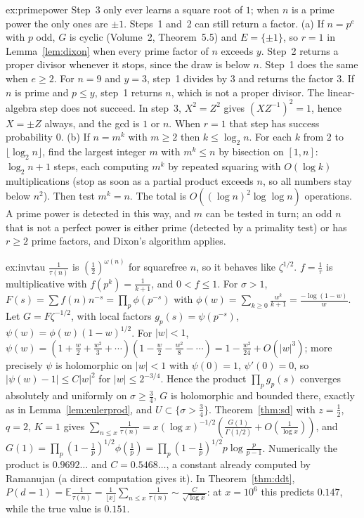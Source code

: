 \begin{solution}{ex:primepower}
\idea Step~3 only ever learns a square root of $1$; when $n$ is a prime power the only ones are $\pm1$. Steps~1 and~2 can still return a factor.
\writeup (a) If $n=p^e$ with $p$ odd, $G$ is cyclic (Volume~2, Theorem~5.5) and $E=\{\pm1\}$, so $r=1$ in Lemma~\ref{lem:dixon} when every prime factor of $n$ exceeds $y$. Step~2 returns a proper divisor whenever it stops, since the draw is below $n$. Step~1 does the same when $e\ge2$. For $n=9$ and $y=3$, step~1 divides by $3$ and returns the factor $3$. If $n$ is prime and $p\le y$, step~1 returns $n$, which is not a proper divisor. The linear-algebra step does not succeed. In step~3, $X^2=Z^2$ gives $(XZ^{-1})^2=1$, hence $X=\pm Z$ always, and the gcd is $1$ or $n$. When $r=1$ that step has success probability $0$. (b) If $n=m^k$ with $m\ge2$ then $k\le\log_2n$. For each $k$ from $2$ to $\lfloor\log_2n\rfloor$, find the largest integer $m$ with $m^k\le n$ by bisection on $[1,n]$: $\log_2n+1$ steps, each computing $m^k$ by repeated squaring with $O(\log k)$ multiplications (stop as soon as a partial product exceeds $n$, so all numbers stay below $n^2$). Then test $m^k=n$. The total is $O((\log n)^2\log\log n)$ operations. A prime power is detected in this way, and $m$ can be tested in turn; an odd $n$ that is not a perfect power is either prime (detected by a primality test) or has $r\ge2$ prime factors, and Dixon's algorithm applies.
\end{solution}

\begin{solution}{ex:invtau}
\idea $\frac1{\tau(n)}$ is $(\frac12)^{\omega(n)}$ for squarefree $n$, so it behaves like $\zeta^{1/2}$.
\writeup $f=\frac1\tau$ is multiplicative with $f(p^k)=\frac1{k+1}$, and $0<f\le1$. For $\sigma>1$, $F(s)=\sum f(n)n^{-s}=\prod_p\phi(p^{-s})$ with $\phi(w)=\sum_{k\ge0}\frac{w^k}{k+1}=\frac{-\log(1-w)}w$. Let $G=F\zeta^{-1/2}$, with local factors $g_p(s)=\psi(p^{-s})$, $\psi(w)=\phi(w)(1-w)^{1/2}$. For $|w|<1$, $\psi(w)=(1+\frac w2+\frac{w^2}3+\cdots)(1-\frac w2-\frac{w^2}8-\cdots)=1-\frac{w^2}{24}+O(|w|^3)$; more precisely $\psi$ is holomorphic on $|w|<1$ with $\psi(0)=1$, $\psi'(0)=0$, so $|\psi(w)-1|\le C|w|^2$ for $|w|\le2^{-3/4}$. Hence the product $\prod_pg_p(s)$ converges absolutely and uniformly on $\sigma\ge\frac34$, $G$ is holomorphic and bounded there, exactly as in Lemma~\ref{lem:eulerprod}, and $U\subset\{\sigma>\frac34\}$. Theorem~\ref{thm:sd} with $z=\frac12$, $q=2$, $K=1$ gives $\sum_{n\le x}\frac1{\tau(n)}=x(\log x)^{-1/2}(\frac{G(1)}{\Gamma(1/2)}+O(\frac1{\log x}))$, and $G(1)=\prod_p(1-\frac1p)^{1/2}\phi(\frac1p)=\prod_p(1-\frac1p)^{1/2}p\log\frac p{p-1}$. Numerically the product is $0.9692\ldots$ and $C=0.5468\ldots$, a constant already computed by Ramanujan (a direct computation gives it). In Theorem~\ref{thm:ddt}, $P(d=1)=\mathbb E\frac1{\tau(n)}=\frac1{\lfloor x\rfloor}\sum_{n\le x}\frac1{\tau(n)}\sim\frac C{\sqrt{\log x}}$: at $x=10^6$ this predicts $0.147$, while the true value is $0.151$.
\end{solution}

